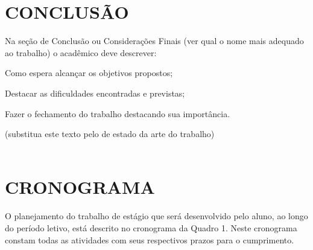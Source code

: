  
{\let\clearpage\relax \chapter{CONCLUSÃO}} %
\label{chap:conclusao}
Na seção de Conclusão ou Considerações Finais (ver qual o nome mais adequado ao trabalho) o acadêmico deve descrever:

Como espera alcançar os objetivos propostos;

Destacar as dificuldades encontradas e previstas;

Fazer o fechamento do trabalho destacando sua importância.

(substitua este texto pelo de estado da arte do trabalho)
 \\ \\
 
 
{\let\clearpage\relax \chapter{CRONOGRAMA}}
\label{chap:cronograma}
O planejamento do trabalho de estágio que será desenvolvido pelo aluno, ao longo do período letivo, está descrito no cronograma da Quadro 1. Neste cronograma constam todas as atividades com seus respectivos prazos para o cumprimento.

